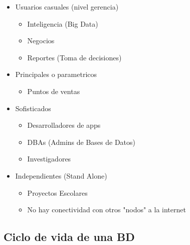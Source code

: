 \documentclass[twoside]{article}
\begin{document}
\begin{itemize}
  \item Usuarios casuales (nivel gerencia)
  \begin{itemize}
    \item Inteligencia (Big Data)
    \item Negocios
    \item Reportes (Toma de decisiones)
  \end{itemize}
  \item Principales o parametricos
  \begin{itemize}
    \item Puntos de ventas
  \end{itemize}
  \item Sofisticados
  \begin{itemize}
    \item Desarrolladores de apps
    \item DBAs (Admins de Bases de Datos)
    \item Investigadores
  \end{itemize}
  \item Independientes (Stand Alone)
  \begin{itemize}
    \item Proyectos Escolares
    \item No hay conectividad con otros "nodos" a la internet
  \end{itemize}
\end{itemize}

\subsection{Ciclo de vida de una BD}
\end{document}
